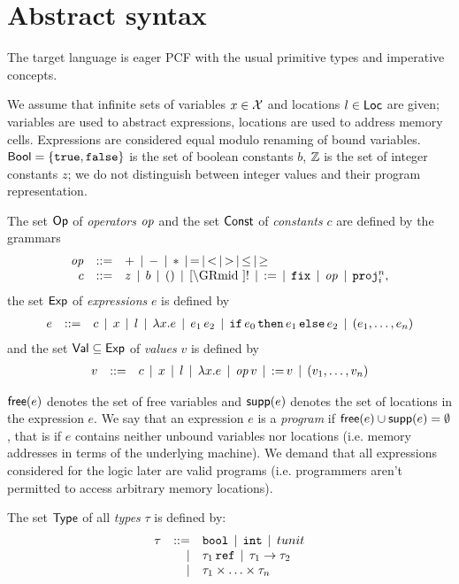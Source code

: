 \documentclass[12pt,a4paper]{article}
\begin{document}

\section{Abstract syntax}

The target language is eager PCF with the usual primitive types and imperative concepts.

We assume that infinite sets of variables $x \in \mathcal{X}$ and locations $l \in \mathsf{Loc}$ are given;
variables are used to abstract expressions, locations are used to address memory cells.
Expressions are considered equal modulo renaming of bound variables.
$\mathsf{Bool}=\{\mathtt{true},\mathtt{false}\}$ is the set of boolean constants $b$, $\mathbb Z$ is the set of integer
constants $z$; we do not distinguish between integer values and their program representation.

\begin{definition}[Expressions]
  The set $\mathsf{Op}$ of {\em operators} $\mathit{op}$ and the set $\mathsf{Const}$ of {\em constants} $c$
  are defined by the grammars
  \[\GRbeg
    \op \GRis + \GRmid - \GRmid * \GRmid = \GRmid < \GRmid > \GRmid \le \GRmid \ge \\
    c \GRis z \GRmid b \GRmid \unit \GRmid \cref \GRmid !
             \GRmid \assign \GRmid \fix \GRmid \op \GRmid \proj{n}{i},
  \GRend\]
  the set $\mathsf{Exp}$ of {\em expressions} $e$ is defined by
  \[\begin{array}{rrlll}
    e & ::= & c \,\mid\, x \,\mid\, l \,\mid\, \lambda x.e \,\mid\, e_1\,e_2
      \,\mid\, \mathtt{if}\,e_0\,\mathtt{then}\,e_1\,\mathtt{else}\,e_2 \,\mid\, (e_1,\ldots,e_n)
  \end{array}\]
  and the set $\mathsf{Val} \subseteq \mathsf{Exp}$ of {\em values} $v$ is defined by
  \[\begin{array}{rrlll}
    v & ::= & c \,\mid\, x \,\mid\, l \,\mid\, \lambda x.e \,\mid\, \mathit{op}\,v \,\mid\, \mathtt{:=}\,v
      \,\mid\, (v_1,\ldots,v_n)
  \end{array}\]
\end{definition}

$\mathsf{free}(e)$ denotes the set of free variables and $\mathsf{supp}(e)$ denotes the set of locations in the
expression $e$. We say that an expression $e$ is a {\em program} if $\mathsf{free}(e)\cup\mathsf{supp}(e)=\emptyset$,
that is if $e$ contains neither unbound variables nor
locations (i.e. memory addresses in terms of the underlying machine). We demand that all expressions
considered for the logic later are valid programs (i.e. programmers aren't permitted to access
arbitrary memory locations).

\begin{definition}[Types]
  The set $\mathsf{Type}$ of all {\em types} $\tau$ is defined by:
  \[\begin{array}{rrlll}
  \tau & ::= & \mathtt{bool} \,\mid\, \mathtt{int} \,\mid\, tunit
  \\ & \mid & \tau_1\,\mathtt{ref} \,\mid\, \tau_1\to\tau_2
  \\ & \mid & \tau_1 \times \ldots \times \tau_n
  \end{array}\]
\end{definition}
\end{document}
